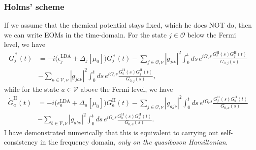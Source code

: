 \subsubsection{Holms' scheme}
If we assume that the chemical potential stays fixed, which he does NOT do, then we can write EOMs in the time-domain. For the state $j\in\mathcal O$ below the Fermi level, we have
\begin{align}
    \dot G^{\mathrm H}_j(t)
    &=
-i\bigl(\epsilon_j^{\mathrm{LDA}}+\Delta_j[\mu_0]\bigr)G^{\mathrm H}_j(t)
-\sum_{j\in\mathcal O,\nu}|g_{ji\nu}|^2
\int_0^t ds\,e^{i\Omega_\nu s}
\frac{G^{\mathrm H}_i(s)G^{\mathrm H}_j(t)}{G_{0,j}(s)}\\
&- \sum_{a\in\mathcal V,\nu}|g_{ja\nu}|^2
\int_0^t ds\,e^{i\Omega_\nu s}
\frac{G^{\mathrm H}_a(s)G^{\mathrm H}_j(t)}{G_{0,j}(s)},
\end{align}
while for the state $a\in\mathcal V$ above the Fermi level, we have
\begin{align}
    \dot G^{\mathrm H}_a(t)
    &=
-i\bigl(\epsilon_a^{\mathrm{LDA}}+\Delta_a[\mu_0]\bigr)G^{\mathrm H}_a(t)
-\sum_{j\in\mathcal O,\nu}|g_{aj\nu}|^2
\int_0^t ds\,e^{i\Omega_\nu s}
\frac{G^{\mathrm H}_j(s )G^{\mathrm H}_a(t)}{G_{0,a}(s)}\\
&- \sum_{b\in\mathcal V,\nu}|g_{ab\nu}|^2
\int_0^t ds\,e^{i\Omega_\nu s}
\frac{G^{\mathrm H}_b(s)G^{\mathrm H}_a(t)}{G_{0,a}(s)}.
\end{align}
I have demonstrated numerically that this is equivalent to carrying out self-consistency in the frequency domain, \emph{only on the quasiboson Hamiltonian}.
